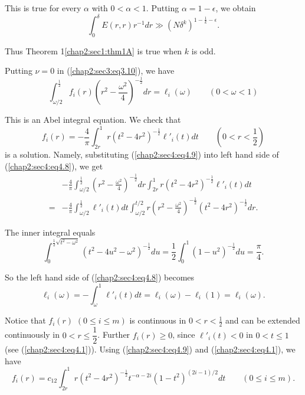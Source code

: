 This is true for every $\alpha$ with $0 < \alpha < 1$. Putting $\alpha = 1 - \epsilon$, we obtain
\begin{equation*}
\int_{0}^{\delta} E(r, r)r^{-1} dr \gg (N\delta^{k})^{1-\frac{1}{k}-\epsilon}.\tag{4.7}\label{chap2:sec4:eq4.7}
\end{equation*}\pageoriginale

Thus Theorem 1\ref{chap2:sec1:thm1A} is true when $k$ is odd.

\medskip
{}

Putting $\nu = 0$ in (\ref{chap2:sec3:eq3.10}), we have
\begin{equation*}
\int_{\omega/2}^{\frac{1}{2}} f_{i} (r) (r^{2} - \frac{\omega^{2}}{4})^{-\frac{1}{2}} dr = \ell_{i} (\omega) \qquad (0 < \omega < 1)\tag{4.8}\label{chap2:sec4:eq4.8}
\end{equation*}

This is an Abel integral equation. We check that
\begin{equation*}
f_{i} (r) = - \frac{4}{\pi} \int_{2r}^{1} r(t^{2} - 4r^{2})^{-\frac{1}{2}} \ell'_{i} (t) dt \qquad (0 < r < \frac{1}{2})\tag{4.9}\label{chap2:sec4:eq4.9}
\end{equation*}
is a solution. Namely, substituting (\ref{chap2:sec4:eq4.9}) into left hand side of (\ref{chap2:sec4:eq4.8}), we get
\begin{align*}
& -\frac{4}{\pi} \int_{\omega/2}^{\frac{1}{2}} (r^{2} - \frac{\omega^{2}}{4})^{-\frac{1}{2}} dr \int_{2r}^{1} r(t^{2} - 4r^{2})^{-\frac{1}{2}} \ell'_{i} (t) dt\\
= & -\frac{4}{\pi} \int_{\omega/2}^{\frac{1}{2}} \ell'_{i}(t) dt \int_{\omega/2}^{t/2} r(r^{2} - \frac{\omega^{2}}{4})^{-\frac{1}{2}} (t^{2} - 4r^{2})^{-\frac{1}{2}} dr.
\end{align*}

The inner integral equals
\begin{equation*}
\int_{0}^{\frac{1}{2} \sqrt{t^{2} - \omega^{2}}} (t^{2} - 4u^{2} - \omega^{2})^{-\frac{1}{2}} du = \frac{1}{2} \int_{0}^{1} (1 - u^{2})^{-\frac{1}{2}} du = \frac{\pi}{4}.
\end{equation*}

So the left hand side of (\ref{chap2:sec4:eq4.8}) becomes
$$
\ell_{i} (\omega) = - \int_{\omega}^{1} \ell'_{i} (t) dt = \ell_{i} (\omega) - \ell_{i} (1) = \ell_{i} (\omega).
$$

Notice that $f_{i} (r)$ $(0 \leq i \leq m)$ is continuous in $0 < r < \frac{1}{2}$ and can be extended continuously in $0 < r \leq \dfrac{1}{2}$. Further $f_{i} (r) \geq 0$, since $\ell'_{i}(t) < 0$ in $0 < t \leq 1$ (see (\ref{chap2:sec4:eq4.1})). Using (\ref{chap2:sec4:eq4.9}) and (\ref{chap2:sec4:eq4.1}), we have
\begin{equation*}
f_{i}(r) = c_{12} \int_{2r}^{1} r(t^{2} - 4r^{2})^{-\frac{1}{2}} t^{-\alpha - 2i} (1-t^{2})^{(2i-1)/2} dt \qquad (0 \leq i \leq m).
\end{equation*}

